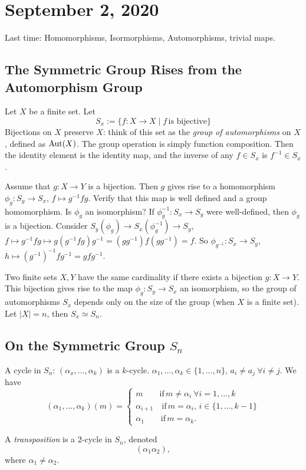 \section{September 2, 2020}
Last time: Homomorphisms, Isormorphisms, Automorphisms, trivial maps.
\subsection{The Symmetric Group Rises from the Automorphism Group}
\begin{example}
    Let $X$ be a finite set. Let \[
        S_x := \{ f \colon X \to X  \mid f \, \text{is bijective}\} 
    \]
    Bijections on $X$ preserve $X$: think of this set as the \emph{group of automorphisms} on $X$, defined as $\operatorname{Aut}(X)$. The group operation is simply function composition. Then the identity element is the identity map, and the inverse of any $f\in S_x$ is $f^{-1}\in S_x$.
\end{example}
Assume that $ g \colon X \to Y$ is a bijection. Then $g$ gives rise to a homomorphism $ \phi_g \colon S_y \to S_x$, $f \mapsto g^{-1}fg$. Verify that this map is well defined and a group homomorphism. Is $\phi_g$ an isomorphism? If $\phi_g^{-1} \colon S_x \to S_y$ were well-defined, then $\phi_g$ is a bijection. Consider $S_y (\phi_g) \to S_x (\phi_g^{-1}) \to S_y$, $f \mapsto g^{-1}fg \mapsto g(g^{-1}fg)g^{-1}=(gg^{-1})f(gg^{-1})=f$. So $\phi_{g^{-1}} \colon S_{x} \to S_{y}$, $h \mapsto (g^{-1})^{-1}fg^{-1}=gfg^{-1}$.

\begin{conclusion}
    Two finite sets $X,Y$ have the same cardinality if there exists a bijection $ g \colon X \to Y$. This bijection gives rise to the map $ \phi_g \colon S_y \to S_x$ an isomorphism, so the group of automorphisms $S_x$ depends only on the size of the group (when $X$ is a finite set). Let $|X|=n$, then $S_x \simeq S_n$.
\end{conclusion}

\subsection{On the Symmetric Group $S_n$}
A cycle in $S_n$: $(\alpha_x , ... , \alpha_k)$ is a $k$-cycle. $\alpha_1 ,...,\alpha_k \in \{1, ...,n\} $, $a_i \neq a_j \ \forall i \neq j$. We have  
\begin{equation*}
    (\alpha_1,...,\alpha_k)(m) = 
\begin{cases}
    m \qquad \mbox{if}\, m \neq \alpha_i \ \forall i=1,...,k\\
    \alpha_{i+1} \quad \mbox{if} \, m=\alpha_i, \, i\in \{1,...,k-1\} \\
    \alpha_1 \qquad \mbox{if} \, m=\alpha_k.

\end{cases}
\end{equation*}
\begin{definition}[Transpositions]
   A \emph{transposition} is a $2$-cycle in $S_n$, denoted  \[
       (\alpha_1 \alpha_2),
   \]
   where $\alpha_1 \neq \alpha_2$.
\end{definition}

